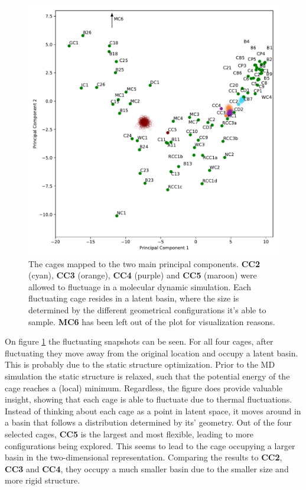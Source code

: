 \documentclass[journal=jacsat,manuscript=article]{achemso}
\begin{document}
{\begin{figure}
\centering
	\includegraphics[width=\columnwidth]{../PCA_latent_cage_space_with_flexible_cages_2D.pdf}
	\caption{\color{red}The cages mapped to the two main principal components. \textbf{CC2} (cyan), \textbf{CC3} (orange), \textbf{CC4} (purple) and \textbf{CC5} (maroon) were allowed to fluctuage in a molecular dynamic simulation. Each fluctuating cage resides in a latent basin, where the size is determined by the different geometrical configurations it's able to sample. \textbf{MC6} has been left out of the plot for visualization reasons.
	} \label{fig:pca_space_with_flex}
\end{figure}

On figure \ref{fig:pca_space_with_flex} the fluctuating snapshots can be seen. For all four cages, after fluctuating they move away from the original location and occupy a latent basin. This is probably due to the static structure optimization. Prior to the MD simulation the static structure is relaxed, such that the potential energy of the cage reaches a (local) minimum. Regardless, the figure does provide valuable insight, showing that each cage is able to fluctuate due to thermal fluctuations. Instead of thinking about each cage as a point in latent space, it moves around in a basin that follows a distribution determined by its' geometry. Out of the four selected cages, \textbf{CC5} is the largest and most flexible, leading to more configurations being explored. This seems to lead to the cage occupying a larger basin in the two-dimensional representation. Comparing the results to \textbf{CC2}, \textbf{CC3} and \textbf{CC4}, they occupy a much smaller basin due to the smaller size and more rigid structure.}
\end{document}
